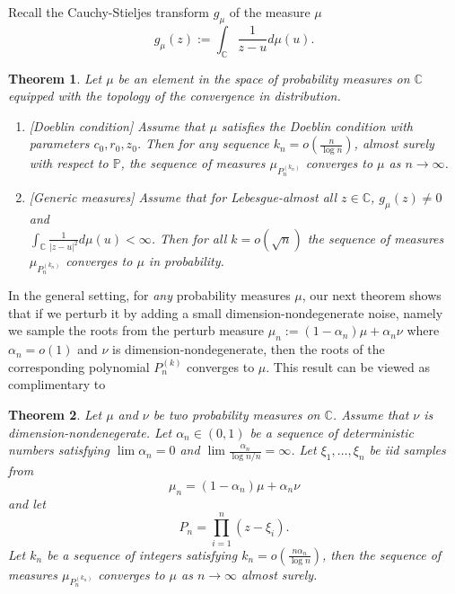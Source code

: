 \documentclass[12pt, reqno]{amsart}
\theoremstyle{plain}
\newtheorem{theorem}{Theorem}[section]
\theoremstyle{definition}
\newcommand\C{{\mathbb{C}}}
\renewcommand\P{{\mathbb{P}}}
\begin{document}
 Recall the Cauchy-Stieljes transform $g_{\mu}$ of the measure $\mu$
 \begin{equation}
 	g_{\mu}(z):= \int_{\C} \frac{1}{z-u}d\mu(u).\label{def:CS}
 \end{equation}

 \begin{theorem}\label{thm:2} Let $\mu$ be an element in the space of probability measures on $\C$ equipped with the topology of the convergence in distribution. 
 	\begin{enumerate} 
 		\item \label{cond:0} [Doeblin condition] Assume that $\mu$ satisfies the Doeblin condition with parameters $c_0, r_0, z_0$. Then for any sequence $k_n=o(\frac{n}{\log n})$, almost surely with respect to $\P$, the sequence of measures $\mu_{P_n^{(k_n)}}$ converges to $\mu$ as $n\to \infty$. 
 		\item \label{cond:mean} [Generic measures] Assume that for Lebesgue-almost all $z\in \C$, $g_\mu(z)\neq 0$  and\\ $\int_{\C} \frac{1}{|z-u|^2}d\mu(u)<\infty$. Then for all $k = o(\sqrt n)$ the sequence of measures $\mu_{P_n^{(k_n)}}$ converges to $\mu$ in probability.
 	\end{enumerate}
 \end{theorem} 
 
 
 In the general setting, for {\it any} probability measures $\mu$, our next theorem shows that if we perturb it by adding a small dimension-nondegenerate noise, namely we sample the roots from the perturb measure $\mu_n:=(1-\alpha_n)\mu + \alpha_n\nu$ where $\alpha_n = o(1)$ and $\nu$ is dimension-nondegenerate, then the roots of the corresponding polynomial $P_n^{(k)}$ converges to $\mu$.  This result can be viewed as complimentary to \cite[Corollary 1.3]{ByunLeeReddy2022}
 
 
 \begin{theorem}\label{thm:perturb}
 	Let $\mu$ and $\nu$ be two probability measures on $\C$. Assume that $\nu$ is dimension-nondenegerate. Let $\alpha_n\in (0, 1)$ be a sequence of deterministic numbers satisfying $\lim \alpha_n = 0$ and $\lim \frac{\alpha_n}{\log n/n} =\infty$. Let $\xi_1, \dots, \xi_n$ be iid samples from  
 	$$\mu_n=(1-\alpha_n)\mu + \alpha_n\nu$$
 	and let 
 	$$P_n = \prod_{i=1}^{n} (z - \xi_i).$$
 	Let $k_n$ be a sequence of integers satisfying $k_n = o(\frac{n\alpha_n}{\log  n})$, then the sequence of measures $\mu_{P_n^{(k_n)}}$ converges to $\mu$ as $n\to \infty$ almost surely.
 \end{theorem}
 
\end{document}
